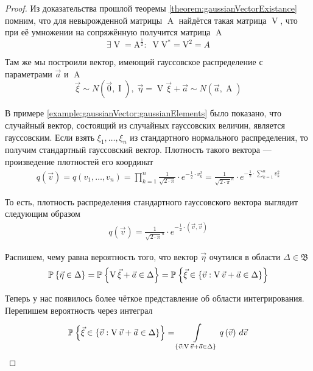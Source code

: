 \begin{proof}
    Из доказательства прошлой теоремы \ref{theorem:gaussianVectorExistance}
    помним, что для невырожденной матрицы $\operatorname{A}$ найдётся такая
    матрица $\operatorname{V}$, что при её умножении на сопряжённую получится
    матрица $\operatorname{A}$
    $$\exists \operatorname{V} = \operatorname{A^{\frac{1}{2}}}:\;
        \operatorname{V}\operatorname{V^*} = \operatorname{V^2} = A$$

    Там же мы построили вектор, имеющий гауссовское распределение с параметрами
    $\vec{a}$ и $\operatorname{A}$
    $$\vec{\xi} \sim N\left( \vec{0}, \operatorname{I} \right),\;
        \vec{\eta} = \operatorname{V} \vec{\xi} +\vec{a}
            \sim N\left( \vec{a}, \operatorname{A} \right)$$

    В примере \ref{example:gaussianVector:gaussianElements} было показано, что
    случайный вектор, состоящий из случайных гауссовских величин, является
    гауссовским. Если взять $\xi_1, \dots, \xi_n$ из стандартного нормального
    распределения, то получим стандартный гауссовский вектор. Плотность такого
    вектора --- произведение плотностей его координат
    \begin{align*}
        q\left( \vec{v} \right)
        = q\left( v_1, \dots, v_n \right)
        = \prod_{k=1}^n \frac{1}{\sqrt{2 \cdot \pi}}
            \cdot e^{-\frac{1}{2} \cdot v_k^2}
        = \frac{1}{\sqrt{2 \cdot \pi}^n}
            \cdot e^{-\frac{1}{2} \cdot \sum_{k=1}^n v_k^2}
    \end{align*}

    То есть, плотность распределения стандартного гауссовского вектора выглядит
    следующим образом
    \begin{align*}
        q\left( \vec{v} \right)
        = \frac{1}{\sqrt{2 \cdot \pi}^n}
            \cdot e^{-\frac{1}{2} \cdot \left( \vec{v}, \vec{v} \right)}
    \end{align*}

    Распишем, чему равна вероятность того, что вектор $\vec{\eta}$ очутился
    в области $\Delta \in \mathfrak{B}$
    \begin{equation}\label{eq:gaussVectorProbabilityStart}
        \Probability{\vec{\eta} \in \Delta}
        = \Probability{\operatorname{V} \vec{\xi} + \vec{a} \in \Delta}
        = \Probability{\vec{\xi} \in \left\{ \vec{v}:
            \operatorname{V} \vec{v} + \vec{a} \in \Delta \right\}}
    \end{equation}

    Теперь у нас появилось более чёткое представление об области интегрирования.
    Перепишем вероятность через интеграл
    $$\Probability{\vec{\xi} \in \left\{ \vec{v}:
            \operatorname{V} \vec{v} + \vec{a} \in \Delta \right\}}
        = \integrall{\left\{ \vec{v}: \operatorname{V} \vec{v} + \vec{a}
            \in \Delta \right\}}{d\vec{v}}{q\left( \vec{v} \right)}$$


\end{proof}
